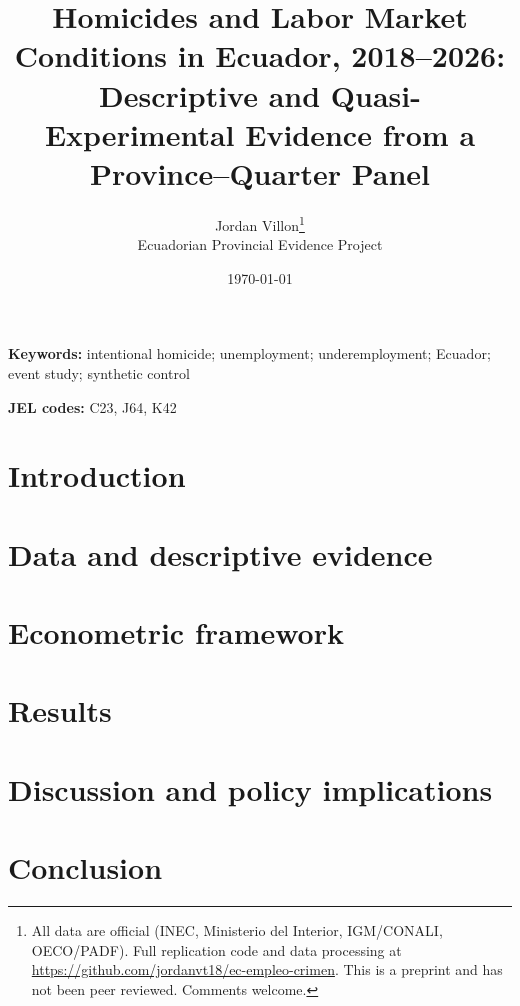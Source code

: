\documentclass[11pt]{article}
\title{\textbf{Homicides and Labor Market Conditions in Ecuador, 2018--2026: \\ Descriptive and Quasi-Experimental Evidence from a Province--Quarter Panel}}
\author{%
  Jordan Villon\thanks{All data are official (INEC, Ministerio del Interior, IGM/CONALI, OECO/PADF). Full replication code and data processing at \url{https://github.com/jordanvt18/ec-empleo-crimen}. This is a preprint and has not been peer reviewed. Comments welcome.} \\
  \small Ecuadorian Provincial Evidence Project}
\date{\today}
\begin{document}
\maketitle

\begin{abstract}

\end{abstract}

\noindent\textbf{Keywords:} intentional homicide; unemployment; underemployment; Ecuador; event study; synthetic control
\smallskip

\noindent\textbf{JEL codes:} C23, J64, K42
\medskip

\section{Introduction}


\section{Data and descriptive evidence}


\section{Econometric framework}


\section{Results}


\section{Discussion and policy implications}


\section{Conclusion}


\nocite{*}


\end{document}
